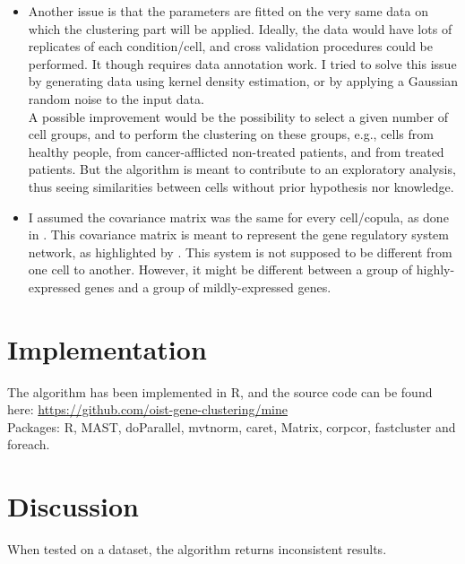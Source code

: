 \documentclass{report}
\begin{document}
\begin{itemize}
\item Another issue is that the parameters are fitted on the very same data on which the clustering part will be applied. Ideally, the data would have lots of replicates of each condition/cell, and cross validation procedures could be performed. It though requires data annotation work. I tried to solve this issue by generating data using kernel density estimation, or by applying a Gaussian random noise to the input data.\\

A possible improvement would be the possibility to select a given number of cell groups, and to perform the clustering on these groups, e.g., cells from healthy people, from cancer-afflicted non-treated patients, and from treated patients. But the algorithm is meant to contribute to an exploratory analysis, thus seeing similarities between cells without prior hypothesis nor knowledge.

\item I assumed the covariance matrix was the same for every cell/copula, as done in \cite{zhang2017classification}. This covariance matrix is meant to represent the gene regulatory system network, as highlighted by \cite{schafer2005shrinkage}. This system is not supposed to be different from one cell to another. However, it might be different between a group of highly-expressed genes and a group of mildly-expressed genes.

\end{itemize}

\section{Implementation}

The algorithm has been implemented in R, and the source code can be found here: {\url{https://github.com/oist-gene-clustering/mine}}\\

Packages: R\cite{baser}, MAST\cite{mastr}, doParallel\cite{doparallelr}, mvtnorm\cite{mvtnormr}, caret\cite{caretr}, Matrix\cite{matrixr}, corpcor\cite{corpcorr}, fastcluster\cite{fastclusterr} and foreach\cite{foreachr}.\\

\section{Discussion}

When tested on a dataset, the algorithm returns inconsistent results.\\ %
\end{document}
